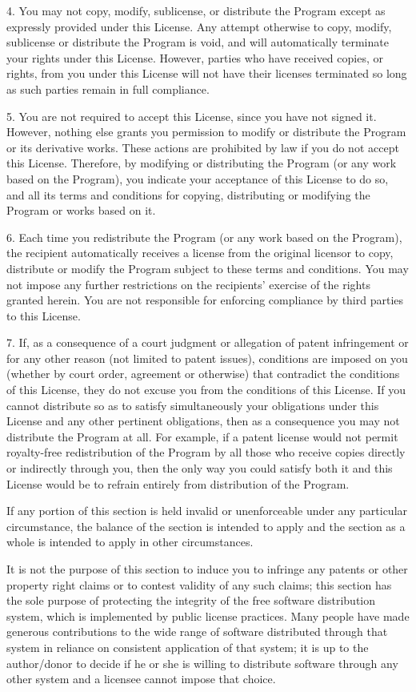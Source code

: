 4. You may not copy, modify, sublicense, or distribute the Program
except as expressly provided under this License.  Any attempt
otherwise to copy, modify, sublicense or distribute the Program is
void, and will automatically terminate your rights under this License.
However, parties who have received copies, or rights, from you under
this License will not have their licenses terminated so long as such
parties remain in full compliance.

5. You are not required to accept this License, since you have not
signed it.  However, nothing else grants you permission to modify or
distribute the Program or its derivative works.  These actions are
prohibited by law if you do not accept this License.  Therefore, by
modifying or distributing the Program (or any work based on the
Program), you indicate your acceptance of this License to do so, and
all its terms and conditions for copying, distributing or modifying
the Program or works based on it.

6. Each time you redistribute the Program (or any work based on the
Program), the recipient automatically receives a license from the
original licensor to copy, distribute or modify the Program subject to
these terms and conditions.  You may not impose any further
restrictions on the recipients' exercise of the rights granted herein.
You are not responsible for enforcing compliance by third parties to
this License.

7. If, as a consequence of a court judgment or allegation of patent
infringement or for any other reason (not limited to patent issues),
conditions are imposed on you (whether by court order, agreement or
otherwise) that contradict the conditions of this License, they do not
excuse you from the conditions of this License.  If you cannot
distribute so as to satisfy simultaneously your obligations under this
License and any other pertinent obligations, then as a consequence you
may not distribute the Program at all.  For example, if a patent
license would not permit royalty-free redistribution of the Program by
all those who receive copies directly or indirectly through you, then
the only way you could satisfy both it and this License would be to
refrain entirely from distribution of the Program.

If any portion of this section is held invalid or unenforceable under
any particular circumstance, the balance of the section is intended to
apply and the section as a whole is intended to apply in other
circumstances.

It is not the purpose of this section to induce you to infringe any
patents or other property right claims or to contest validity of any
such claims; this section has the sole purpose of protecting the
integrity of the free software distribution system, which is
implemented by public license practices.  Many people have made
generous contributions to the wide range of software distributed
through that system in reliance on consistent application of that
system; it is up to the author/donor to decide if he or she is willing
to distribute software through any other system and a licensee cannot
impose that choice.

